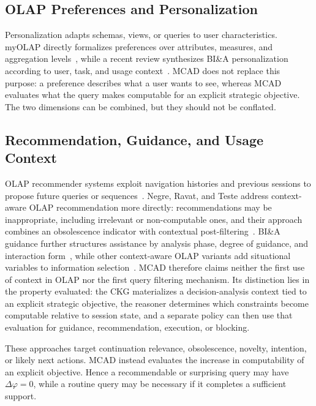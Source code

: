 \documentclass[journal]{IEEEtran}
\begin{document}
\subsection{OLAP Preferences and Personalization}

Personalization adapts schemas, views, or queries to user characteristics. myOLAP directly formalizes preferences over attributes, measures, and aggregation levels~\cite{GolfarelliRizziBiondi2011}, while a recent review synthesizes BI\&A personalization according to user, task, and usage context~\cite{JacobGunklachMaedche2025}. MCAD does not replace this purpose: a preference describes what a user wants to see, whereas MCAD evaluates what the query makes computable for an explicit strategic objective. The two dimensions can be combined, but they should not be conflated.

\subsection{Recommendation, Guidance, and Usage Context}

OLAP recommender systems exploit navigation histories and previous sessions to propose future queries or sequences~\cite{AligonDSS2015}. Negre, Ravat, and Teste address context-aware OLAP recommendation more directly: recommendations may be inappropriate, including irrelevant or non-computable ones, and their approach combines an obsolescence indicator with contextual post-filtering~\cite{NegreRavatTeste2018}. BI\&A guidance further structures assistance by analysis phase, degree of guidance, and interaction form~\cite{GunklachNadj2023}, while other context-aware OLAP variants add situational variables to information selection~\cite{RoyContextOLAP2022}. MCAD therefore claims neither the first use of context in OLAP nor the first query filtering mechanism. Its distinction lies in the property evaluated: the CKG materializes a decision-analysis context tied to an explicit strategic objective, the reasoner determines which constraints become computable relative to session state, and a separate policy can then use that evaluation for guidance, recommendation, execution, or blocking.

These approaches target continuation relevance, obsolescence, novelty, intention, or likely next actions. MCAD instead evaluates the increase in computability of an explicit objective. Hence a recommendable or surprising query may have $\Delta\varphi=0$, while a routine query may be necessary if it completes a sufficient support.
\end{document}
